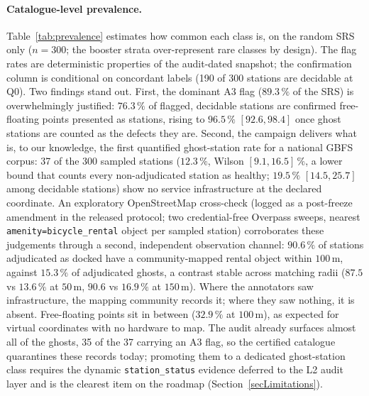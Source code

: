 \documentclass[11pt,a4paper]{article}
\begin{document}
\paragraph{Catalogue-level prevalence.}
Table~\ref{tab:prevalence} estimates how common each class is, on the
random SRS only ($n = 300$; the booster strata over-represent rare
classes by design). The flag rates are deterministic properties of the
audit-dated snapshot; the confirmation column is conditional on
concordant labels (190 of 300 stations are decidable at Q0). Two findings
stand out. First, the dominant A3 flag ($89.3\,\%$ of the SRS) is
overwhelmingly justified: $76.3\,\%$ of flagged, decidable stations are
confirmed free-floating points presented as stations, rising to
$96.5\,\%$ $[92.6, 98.4]$ once ghost stations are counted as the defects
they are. Second, the campaign delivers what is, to our knowledge, the
first quantified ghost-station rate for a national GBFS corpus: 37 of the
300 sampled stations ($12.3\,\%$, Wilson $[9.1, 16.5]\,\%$, a lower bound
that counts every non-adjudicated station as healthy; $19.5\,\%$
$[14.5, 25.7]$ among decidable stations) show no service infrastructure
at the declared coordinate. An exploratory OpenStreetMap cross-check
(logged as a post-freeze amendment in the released protocol; two
credential-free Overpass sweeps, nearest
\texttt{amenity=bicycle\_rental} object per sampled station) corroborates
these judgements through a second, independent observation channel:
$90.6\,\%$ of stations adjudicated as docked have a community-mapped
rental object within $100$\,m, against $15.3\,\%$ of adjudicated ghosts,
a contrast stable across matching radii ($87.5$ vs $13.6\,\%$ at
$50$\,m, $90.6$ vs $16.9\,\%$ at $150$\,m). Where the annotators saw
infrastructure, the mapping community records it; where they saw nothing,
it is absent. Free-floating points sit in between ($32.9\,\%$ at
$100$\,m), as expected for virtual coordinates with no hardware to map.
The audit already surfaces almost all of
the ghosts, 35 of the 37 carrying an A3 flag, so the certified catalogue
quarantines these records today; promoting them to a dedicated
ghost-station class requires the dynamic \texttt{station\_status}
evidence deferred to the L2 audit layer and is the clearest item on the
roadmap (Section~\ref{secLimitations}).
\end{document}
